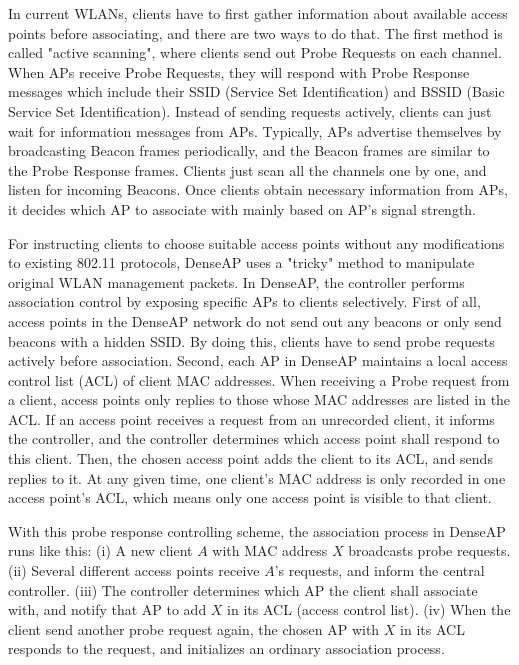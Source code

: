 \documentclass[english]{tktltiki}
\begin{document}
In current WLANs, clients have to first gather information about available access points before associating, and there are two ways to do that. The first method is called "active scanning", where clients send out Probe Requests on each channel. When APs receive Probe Requests, they will respond with Probe Response messages which include their SSID (Service Set Identification) and BSSID (Basic Service Set Identification). Instead of sending requests actively, clients can just wait for information messages from APs. Typically, APs advertise themselves by broadcasting Beacon frames periodically, and the Beacon frames are similar to the Probe Response frames. Clients just scan all the channels one by one, and listen for incoming Beacons. Once clients obtain necessary information from APs, it decides which AP to associate with mainly based on AP's signal strength. 

For instructing clients to choose suitable access points without any modifications to existing 802.11 protocols, DenseAP uses a "tricky" method to manipulate original WLAN management packets. In DenseAP, the controller performs association control by exposing specific APs to clients selectively. First of all, access points in the DenseAP network do not send out any beacons or only send beacons with a hidden SSID. By doing this, clients have to send probe requests actively before association. Second, each AP in DenseAP maintains a local access control list (ACL) of client MAC addresses. When receiving a Probe request from a client, access points only replies to those whose MAC addresses are listed in the ACL. If an access point receives a request from an unrecorded client, it informs the controller, and the controller determines which access point shall respond to this client. Then, the chosen access point adds the client to its ACL, and sends replies to it. At any given time, one client's MAC address is only recorded in one access point's ACL, which means only one access point is visible to that client.

With this probe response controlling scheme, the association process in DenseAP runs like this: (i) A new client $A$ with MAC address $X$ broadcasts probe requests. (ii) Several different access points receive $A$'s requests, and inform the central controller. (iii) The controller determines which AP the client shall associate with, and notify that AP to add $X$ in its ACL (access control list). (iv) When the client send another probe request again, the chosen AP with $X$ in its ACL responds to the request, and initializes an ordinary association process.
\end{document}
